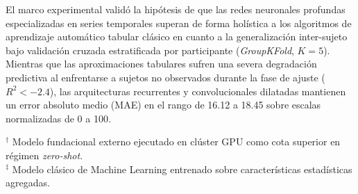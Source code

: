 El marco experimental validó la hipótesis de que las redes neuronales profundas especializadas en series temporales superan de forma holística a los algoritmos de aprendizaje automático tabular clásico en cuanto a la generalización inter-sujeto bajo validación cruzada estratificada por participante (\textit{GroupKFold}, $K=5$). Mientras que las aproximaciones tabulares sufren una severa degradación predictiva al enfrentarse a sujetos no observados durante la fase de ajuste ($R^2 < -2.4$), las arquitecturas recurrentes y convolucionales dilatadas mantienen un error absoluto medio (MAE) en el rango de 16.12 a 18.45 sobre escalas normalizadas de 0 a 100.

\begin{table}[htbp]
\centering
\caption{Ficha técnica y comparativa computacional de los modelos de  frente a referencias externas.}
\label{tab:comparativa_modelos_fisiologicos}
\small
\renewcommand{\arraystretch}{1.15}
\begin{flushleft}
\footnotesize
$^\dagger$ Modelo fundacional externo ejecutado en clúster GPU como cota superior en régimen \textit{zero-shot}. \\
$^\ddagger$ Modelo clásico de Machine Learning entrenado sobre características estadísticas agregadas.
\end{flushleft}
\end{table}

